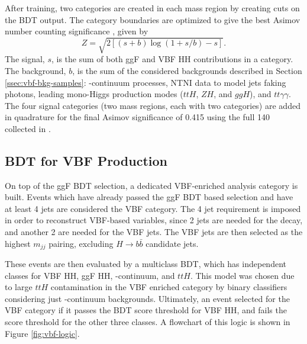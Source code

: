 After training, two categories are created in each mass region by creating cuts on the BDT output. The category boundaries are optimized to give the best Asimov number counting significance \cite{asimov}, given by
\begin{equation}\label{eqn:asimov-significance}
    Z = \sqrt{2[(s+b)\log{(1 + s/b)} -s]}.
\end{equation}
The signal, $s$, is the sum of both ggF and VBF HH contributions in a category. The background, $b$, is the sum of the considered backgrounds described in Section \ref{ssec:vbf-bkg-samples}: \yy-continuum processes, \gls{NTNI} data to model jets faking photons, leading mono-Higgs production modes ($ttH$, $ZH$, and $ggH$), and $tt\gamma\gamma$. The four signal categories (two mass regions, each with two categories) are added in quadrature for the final Asimov significance of 0.415 using the full 140 \ifb collected in \RunTwo.


\subsection{BDT for VBF Production}\label{ssec:vbf-bdt}
On top of the ggF \gls{BDT} selection, a dedicated VBF-enriched analysis category is built. Events which have already passed the ggF BDT based selection and have at least 4 jets are considered the VBF category. The 4 jet requirement is imposed in order to reconstruct VBF-based variables, since 2 jets are needed for the \Hbb decay, and another 2 are needed for the VBF jets. The VBF jets are then selected as the highest $m_{jj}$ pairing, excluding $H\rightarrow b\bar{b}$ candidate jets.

These events are then evaluated by a multiclass BDT, which has independent classes for VBF HH, ggF HH, \yy-continuum, and $ttH$. This model was chosen due to large $ttH$ contamination in the VBF enriched category by binary classifiers considering just \yy-continuum backgrounds. Ultimately, an event selected for the VBF category if it passes the BDT score threshold for VBF HH, and fails the score threshold for the other three classes. A flowchart of this logic is shown in Figure \ref{fig:vbf-logic}.

